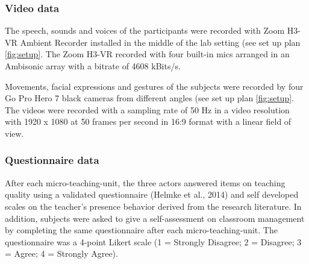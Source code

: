 \documentclass[
  man]{apa6}
\begin{document}
\hypertarget{video-data}{%
\subsubsection{Video data}\label{video-data}}

The speech, sounds and voices of the participants were recorded with Zoom H3-VR Ambient Recorder installed in the middle of the lab setting (see set up plan \ref{fig:setup}. The Zoom H3-VR recorded with four built-in mics arranged in an Ambisonic array with a bitrate of 4608 kBits/s.

Movements, facial expressions and gestures of the subjects were recorded by four Go Pro Hero 7 black cameras from different angles (see set up plan \ref{fig:setup}. The videos were recorded with a sampling rate of 50 Hz in a video resolution with 1920 x 1080 at 50 frames per second in 16:9 format with a linear field of view.

\hypertarget{questionnaire-data}{%
\subsubsection{Questionnaire data}\label{questionnaire-data}}

After each micro-teaching-unit, the three actors answered items on teaching quality using a validated questionnaire (Helmke et al., 2014) and self developed scales on the teacher's presence behavior derived from the research literature. In addition, subjects were asked to give a self-assessment on classroom management by completing the same questionnaire after each micro-teaching-unit. The questionnaire was a 4-point Likert scale (1 = Strongly Disagree; 2 = Disagree; 3 = Agree; 4 = Strongly Agree).
\end{document}
